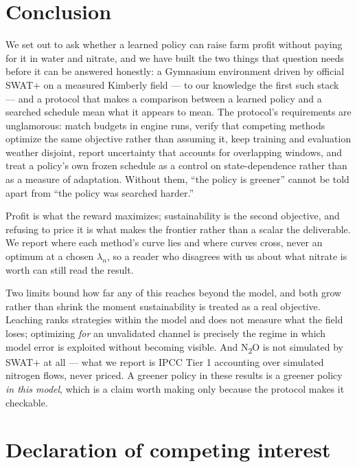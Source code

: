 \documentclass[a4paper,fleqn]{cas-sc}
\begin{document}
\section{Conclusion}\label{sec:conclusion}

We set out to ask whether a learned policy can raise farm profit without paying for it in
water and nitrate, and we have built the two things that question needs before it can be
answered honestly: a Gymnasium environment driven by official SWAT+ on a measured
Kimberly field --- to our knowledge the first such stack --- and a protocol that makes a
comparison between a learned policy and a searched schedule mean what it appears to mean.
The protocol's requirements are unglamorous: match budgets in engine runs, verify that
competing methods optimize the same objective rather than assuming it, keep training and
evaluation weather disjoint, report uncertainty that accounts for overlapping windows,
and treat a policy's own frozen schedule as a control on state-dependence rather than as
a measure of adaptation. Without them, ``the policy is greener'' cannot be told apart
from ``the policy was searched harder.''

Profit is what the reward maximizes; sustainability is the second objective, and refusing
to price it is what makes the frontier rather than a scalar the deliverable. We report
where each method's curve lies and where curves cross, never an optimum at a chosen
$\lambda_n$, so a reader who disagrees with us about what nitrate is worth can still read
the result.

Two limits bound how far any of this reaches beyond the model, and both grow rather than
shrink the moment sustainability is treated as a real objective. Leaching ranks
strategies within the model and does not measure what the field loses; optimizing
\emph{for} an unvalidated channel is precisely the regime in which model error is
exploited without becoming visible. And N\textsubscript{2}O is not simulated by SWAT+ at
all --- what we report is IPCC Tier 1 accounting over simulated nitrogen flows, never
priced. A greener policy in these results is a greener policy \emph{in this model}, which
is a claim worth making only because the protocol makes it checkable.

\section*{Declaration of competing interest}
\end{document}
